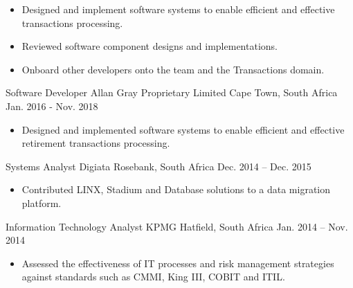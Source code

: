 \begin{cventries}
{\begin{cvitems}
\begin{itemize}
          \item {Designed and implement software systems to enable efficient and effective transactions processing.}
          \item {Reviewed software component designs and implementations.}
          \item {Onboard other developers onto the team and the Transactions domain.}
        \end{itemize}
      \end{cvitems}
    }
  \cventry
    {Software Developer} %
    {Allan Gray Proprietary Limited} %
    {Cape Town, South Africa} %
    {Jan. 2016 - Nov. 2018} %
    {
      \begin{cvitems} %
        \begin{itemize}  
          \item {Designed and implemented software systems to enable efficient and effective retirement transactions processing.}
        \end{itemize}
      \end{cvitems}
    }
  \cventry
    {Systems Analyst} %
    {Digiata} %
    {Rosebank, South Africa} %
    {Dec. 2014 – Dec. 2015}%
    {
      \begin{cvitems} %
        \begin{itemize}  
          \item {Contributed LINX, Stadium and Database solutions to a data migration platform.}
        \end{itemize}
      \end{cvitems}
    }
  \cventry
    {Information Technology Analyst} %
    {KPMG} %
    {Hatfield, South Africa} %
    {Jan. 2014 – Nov. 2014} %
    {
      \begin{cvitems} %
        \begin{itemize}  
          \item{Assessed the effectiveness of IT processes and risk management strategies against standards such as CMMI, King III, COBIT and ITIL.}
        \end{itemize}
      \end{cvitems}
    }
\end{cventries}

